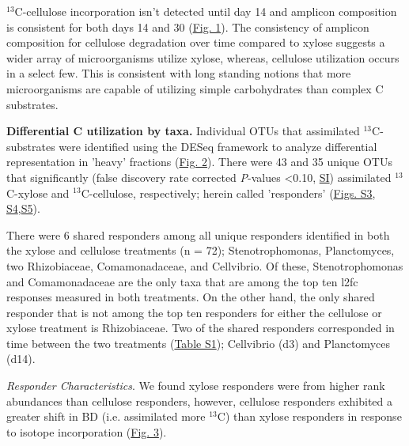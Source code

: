 $^{13}$C-cellulose incorporation isn't detected until day 14 and amplicon
composition is consistent for both days 14 and 30
(\href{https://www.authorea.com/users/3537/articles/3612/master/file/figures/ordination_all1/ordination_all1.png}{Fig.
1}). The consistency of amplicon composition for cellulose degradation over
time compared to xylose suggests a wider array of microorganisms utilize
xylose, whereas, cellulose utilization occurs in a select few. This is
consistent with long standing notions that more microorganisms are capable of
utilizing simple carbohydrates than complex C substrates. 



\textbf{Differential C utilization by taxa.} Individual OTUs that assimilated
$^{13}$C-substrates were identified using the DESeq framework
\citep{Anders_Huber_2010} to analyze differential representation in 'heavy'
fractions
(\href{https://www.authorea.com/users/3537/articles/3612/master/file/figures/l2fc_fig1/l2fc_fig.pdf}{Fig.
2}). There were 43 and 35 unique OTUs that significantly (false discovery rate
corrected \textit{P}-values \textless 0.10,
\href{https://authorea.com/users/3537/articles/8459/_show_article}{SI})
assimilated $^{13}$C-xylose and $^{13}$C-cellulose, respectively; herein called
'responders'
(\href{https://www.authorea.com/users/3537/articles/8459/master/file/figures/OTU_screening_schematic/OTU_screening_schematic.pdf}{Figs.
S3},
\href{https://www.authorea.com/users/3537/articles/8459/master/file/figures/l2fc_fig_pVal/l2fc_fig_pVal.png}{S4},\href{https://authorea.com/users/3537/articles/8459/master/file/figures/manhattan/manhattan.png}{S5}).






There were 6 shared responders among all unique responders identified in both
the xylose and cellulose treatments (n = 72); Stenotrophomonas, Planctomyces,
two Rhizobiaceae, Comamonadaceae, and Cellvibrio. Of these, Stenotrophomonas
and Comamonadaceae are the only taxa that are among the top ten l2fc responses
measured in both treatments. On the other hand, the only shared responder that
is not among the top ten responders for either the cellulose or xylose
treatment is Rhizobiaceae. Two of the shared responders corresponded in time
between the two treatments
(\href{https://authorea.com/users/3537/articles/8459/master/file/figures/resp_table/resp_table.png}{Table
S1}); Cellvibrio (d3) and Planctomyces (d14).  

\textit{Responder Characteristics}.  We found xylose responders were from
higher rank abundances than cellulose responders, however, cellulose responders
exhibited a greater shift in BD (i.e. assimilated more $^{13}$C) than xylose
responders in response to isotope incorporation
(\href{https://authorea.com/users/3537/articles/3612/master/file/figures/shift_and_rabund2/shift_and_rabund2.png}{Fig.
3}). 

